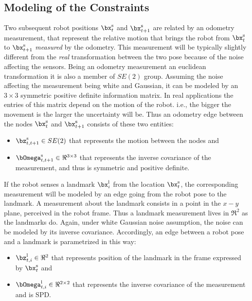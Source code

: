 \documentclass[a4paper]{article}
\begin{document}
\subsection{Modeling of the Constraints}
Two subsequent robot positions $\bx^\mathrm{s}_t$ and
$\bx^\mathrm{s}_{t+1}$ are related by an odometry measurement, that
represent the relative motion that brings the robot from
$\bx^\mathrm{s}_t$ to $\bx^\mathrm{s}_{t+1}$ \emph{measured} by the
odometry. This measurement will be typically slightly different from
the \emph{real} transformation between the two pose because of the
noise affecting the sensors.  Being an odometry measurement an
euclidean transformation it is also a member of $SE(2)$ group.
Assuming the noise affecting the measurement being white and Gaussian,
it can be modeled by an $3 \times 3$ symmetric positive definite
information matrix.  In real applications the entries of this matrix
depend on the motion of the robot.  i.e., the bigger the movement is
the larger the uncertainty will be.
Thus an odometry edge between the nodes $\bx^\mathrm{s}_t$ and
$\bx^\mathrm{s}_{t+1}$ consists of these two entities:
\begin{itemize}
\item $\bz^\mathrm{s}_{t,t+1} \in SE(2)$ that represents the motion
  between the nodes and
\item $\bOmega^\mathrm{s}_{t,t+1} \in \Re^{3 \times 3}$ that represents the
  inverse covariance of the measurement, and thus is symmetric and
  positive definite.
\end{itemize}

If the robot senses a landmark $\bx^\mathrm{l}_i$ from the location
$\bx^\mathrm{s}_t$, the corresponding measurement will be modeled by
an edge going from the robot pose to the landmark. A measurement about
the landmark consists in a point in the $x-y$ plane, perceived in the
robot frame. Thus a landmark measurement lives in $\Re^2$ as the
landmarks do. Again, under white Gaussian noise assumption, the
noise can be modeled by its inverse covariance. Accordingly, an edge between
a robot pose and a landmark is parametrized in this way:
\begin{itemize}
\item $\bz^\mathrm{l}_{t,i} \in \Re^2$ that represents position of the landmark
  in the frame expressed by $\bx^\mathrm{s}_t$ and
\item $\bOmega^\mathrm{l}_{t,i} \in \Re^{2 \times 2}$ that represents the inverse
  covariance of the measurement and is SPD.
\end{itemize}
\end{document}

